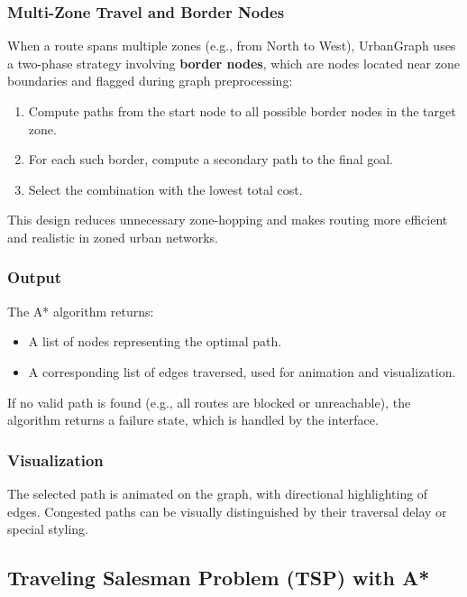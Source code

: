 \documentclass[12pt]{article}
\begin{document}
\subsubsection*{Multi-Zone Travel and Border Nodes}

When a route spans multiple zones (e.g., from North to West), UrbanGraph uses a two-phase strategy involving \textbf{border nodes}, which are nodes located near zone boundaries and flagged during graph preprocessing:
\begin{enumerate}
    \item Compute paths from the start node to all possible border nodes in the target zone.
    \item For each such border, compute a secondary path to the final goal.
    \item Select the combination with the lowest total cost.
\end{enumerate}

This design reduces unnecessary zone-hopping and makes routing more efficient and realistic in zoned urban networks.

\subsubsection*{Output}

The A* algorithm returns:
\begin{itemize}
    \item A list of nodes representing the optimal path.
    \item A corresponding list of edges traversed, used for animation and visualization.
\end{itemize}

If no valid path is found (e.g., all routes are blocked or unreachable), the algorithm returns a failure state, which is handled by the interface.

\subsubsection*{Visualization}

The selected path is animated on the graph, with directional highlighting of edges. Congested paths can be visually distinguished by their traversal delay or special styling.

\subsection{Traveling Salesman Problem (TSP) with A*}
\end{document}

